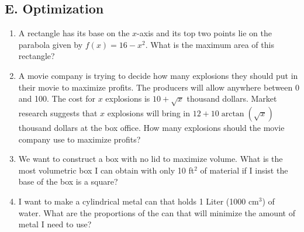 \documentclass{article}
\newcommand{\R}{\mathbb{R}}
\begin{document}
\subsection*{E. Optimization}

\begin{enumerate}
\item A rectangle has its base on the $x$-axis and its top two points lie on the parabola given by $f(x)=16-x^2$. What is the maximum area of this rectangle?
\item A movie company is trying to decide how many explosions they should put in their movie to maximize profits. The producers will allow anywhere between 0 and 100. The cost for $x$ explosions is $10+\sqrt{x}$ thousand dollars. Market research suggests that $x$ explosions will bring in $12+10\arctan(\sqrt{x})$ thousand dollars at the box office. How many explosions should the movie company use to maximize profits?
\item We want to construct a box with no lid to maximize volume. What is the most volumetric box I can obtain with only 10 ft$^2$ of material if I insist the base of the box is a square?
\item I want to make a cylindrical metal can that holds 1 Liter (1000 cm$^3$) of water. What are the proportions of the can that will minimize the amount of metal I need to use?
\end{enumerate}





\newpage




\end{document}
